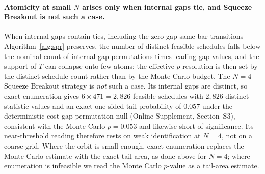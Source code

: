 \documentclass[preprint,12pt]{elsarticle}
\theoremstyle{definition}
\begin{document}
\paragraph{Atomicity at small $N$ arises only when internal gaps tie, and Squeeze Breakout is not such a case.} When internal gaps contain ties, including the zero-gap same-bar transitions
Algorithm~\ref{alg:spr} preserves, the number of distinct feasible schedules falls
below the nominal count of internal-gap permutations times leading-gap values, and the
support of $T$ can collapse onto few atoms; the effective $p$-resolution is then set by
the distinct-schedule count rather than by the Monte Carlo budget. The $N=4$ Squeeze
Breakout strategy is \emph{not} such a case. Its internal gaps are distinct, so exact
enumeration gives $6\times471=2{,}826$ feasible schedules with $2{,}826$ distinct
statistic values and an exact one-sided tail probability of $0.057$ under the
deterministic-cost gap-permutation null (Online Supplement, Section~S3), consistent with
the Monte Carlo $p=0.053$ and likewise short of significance. Its near-threshold reading
therefore rests on weak identification at $N=4$, not on a coarse grid. Where the orbit is small enough, exact enumeration replaces the Monte Carlo estimate
with the exact tail area, as done above for $N=4$; where enumeration is infeasible we
read the Monte Carlo $p$-value as a tail-area estimate.
\end{document}
